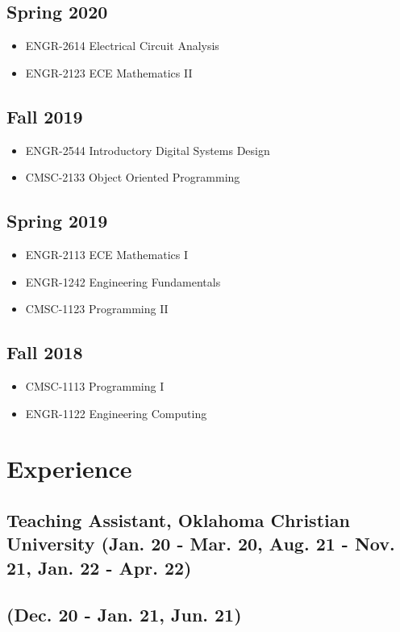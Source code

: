 \documentclass{article}
\begin{document}
		\subsection{Spring 2020}
			\begin{itemize}
				\item ENGR-2614 Electrical Circuit Analysis
				\item ENGR-2123 ECE Mathematics II
			\end{itemize}
		\subsection{Fall 2019}
			\begin{itemize}
				\item ENGR-2544 Introductory Digital Systems Design
				\item CMSC-2133 Object Oriented Programming
			\end{itemize}
		\subsection{Spring 2019}
			\begin{itemize}
				\item ENGR-2113 ECE Mathematics I
				\item ENGR-1242 Engineering Fundamentals
				\item CMSC-1123 Programming II
			\end{itemize}
		\subsection{Fall 2018}
			\begin{itemize}
				\item CMSC-1113 Programming I
				\item ENGR-1122 Engineering Computing
			\end{itemize}

\section{Experience}
	\subsection{Teaching Assistant, Oklahoma Christian University (Jan. 20 - Mar. 20, Aug. 21 - Nov. 21, Jan. 22 - Apr. 22)}
	\subsection{(Dec. 20 - Jan. 21, Jun. 21)}
\end{document}
